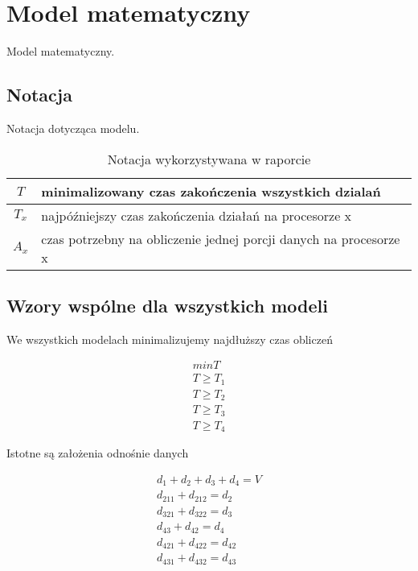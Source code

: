 
\section{Model matematyczny}

Model matematyczny.

\subsection{Notacja}

Notacja dotycząca modelu.

\begin{table}[!ht]
\centering
\begin{tabular}{|c|l|}
\hline
$T$ & minimalizowany czas zakończenia wszystkich dzialań \\ \hline
$T_{x}$ & najpóźniejszy czas zakończenia działań na procesorze x \\ \hline
$A_{x}$ & czas potrzebny na obliczenie jednej porcji danych na procesorze x \\ \hline
\end{tabular}
\caption{Notacja wykorzystywana w raporcie}
\label{tab:notacja}
\end{table}

\subsection{Wzory wspólne dla wszystkich modeli}

We wszystkich modelach minimalizujemy najdłuższy czas obliczeń

\begin{equation} \label{eq:min}
\begin{array}{l}
min T \\
T \geq T_{1} \\
T \geq T_{2} \\
T \geq T_{3} \\
T \geq T_{4}
\end{array}
\end{equation}

Istotne są założenia odnośnie danych

\begin{equation} \label{eq:data}
\begin{array}{l}
d_{1} + d_{2} + d_{3} + d_{4} = V \\
d_{211} + d_{212} = d_{2} \\
d_{321} + d_{322} = d_{3} \\
d_{43} + d_{42} = d_{4} \\
d_{421} + d_{422} = d_{42} \\
d_{431} + d_{432} = d_{43}
\end{array}
\end{equation}

